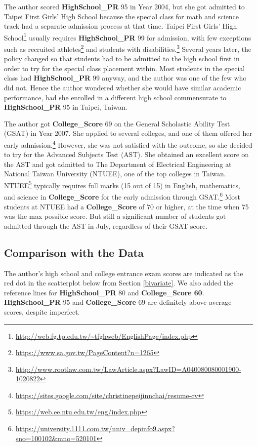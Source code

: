\documentclass[
]{article}
\begin{document}
The author scored \textbf{HighSchool\_PR} 95 in Year 2004, but she got
admitted to Taipei First Girls' High School because the special class
for math and science track had a separate admission process at that
time. Taipei First Girls' High School\footnote{\url{http://web.fg.tp.edu.tw/~tfghweb/EnglishPage/index.php}}
usually requires \textbf{HighSchool\_PR} 99 for admission, with few
exceptions such as recruited athletes\footnote{\url{https://www.sa.gov.tw/PageContent?n=1265}}
and students with disabilities.\footnote{\url{http://www.rootlaw.com.tw/LawArticle.aspx?LawID=A040080080001900-1020822}}
Several years later, the policy changed so that students had to be
admitted to the high school first in order to try for the special class
placement within. Most students in the special class had
\textbf{HighSchool\_PR} 99 anyway, and the author was one of the few who
did not. Hence the author wondered whether she would have similar
academic performance, had she enrolled in a different high school
commensurate to \textbf{HighSchool\_PR} 95 in Taipei, Taiwan.

The author got \textbf{College\_Score} 69 on the General Scholastic
Ability Test (GSAT) in Year 2007. She applied to several colleges, and
one of them offered her early admission.\footnote{\url{https://sites.google.com/site/christinepeijinnchai/resume-cv}}
However, she was not satisfied with the outcome, so she decided to try
for the Advanced Subjects Test (AST). She obtained an excellent score on
the AST and got admitted to The Department of Electrical Engineering at
National Taiwan University (NTUEE), one of the top colleges in Taiwan.
NTUEE\footnote{\url{https://web.ee.ntu.edu.tw/eng/index.php}} typically
requires full marks (15 out of 15) in English, mathematics, and science
in \textbf{College\_Score} for the early admission through
GSAT.\footnote{\url{https://university.1111.com.tw/univ_depinfo9.aspx?sno=100102\&mno=520101}}
Most students at NTUEE had a \textbf{College\_Score} of 70 or higher, at
the time when 75 was the max possible score. But still a significant
number of students got admitted through the AST in July, regardless of
their GSAT score.

\hypertarget{comparison-with-the-data}{%
\subsection{Comparison with the Data}\label{comparison-with-the-data}}

The author's high school and college entrance exam scores are indicated
as the red dot in the scatterplot below from Section \ref{bivariate}. We
also added the reference lines for \textbf{HighSchool\_PR} 80 and
\textbf{College\_Score 60}. \textbf{HighSchool\_PR} 95 and
\textbf{College\_Score} 69 are definitely above-average scores, despite
imperfect.
\end{document}
